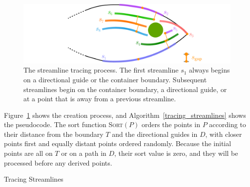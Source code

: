 \begin{figure}
\centering
\includegraphics[width=1.0\textwidth]{figures/flowpak/streamline_tracing.pdf}
\caption[The streamline tracing process]
{\label{streamline_tracing}
The streamline tracing process. The first streamline $s_1$ always begins
on a directional guide or the container boundary.  Subsequent streamlines begin
on the container boundary, a directional guide, or at a point that is 
 away from a previous streamline.}
\end{figure}

Figure~\ref{streamline_tracing} shows the creation process, and 
Algorithm~\ref{tracing_streamlines} shows the pseudocode.
The sort function \textsc{Sort}$(P)$ orders the points in $P$ according to their distance from the
boundary $T$ and the directional guides in $D$, with closer points first and equally distant
points ordered randomly. Because the initial points are all on $T$ or on a path in $D$, their
sort value is zero, and they will be processed before any derived points. 



\begin{algorithm}
\caption{Tracing Streamlines} 
\label{tracing_streamlines}
\end{algorithm}





